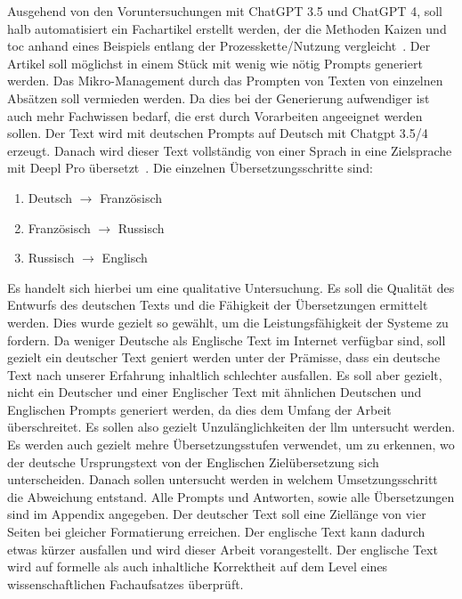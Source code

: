 
Ausgehend von den Voruntersuchungen mit ChatGPT 3.5 und ChatGPT 4, soll halb automatisiert ein Fachartikel erstellt werden,
der die Methoden Kaizen und \gls{toc} anhand eines Beispiels entlang der Prozesskette/Nutzung vergleicht~\cite{openai_chatgpt_nodate}.
Der Artikel soll möglichst in einem Stück mit wenig wie nötig Prompts generiert werden. Das Mikro-Management durch das Prompten von Texten von einzelnen Absätzen soll vermieden werden. Da dies bei der Generierung aufwendiger ist auch mehr Fachwissen bedarf, die erst durch Vorarbeiten angeeignet werden sollen.
Der Text wird mit deutschen Prompts auf Deutsch mit Chatgpt 3.5/4 erzeugt. Danach wird dieser Text vollständig von einer Sprach in eine Zielsprache mit Deepl Pro übersetzt~\cite{deepl_deepl_nodate}.
Die einzelnen Übersetzungsschritte sind:

\begin{enumerate}
	\item Deutsch $\rightarrow$ Französisch
	\item Französisch $\rightarrow$ Russisch
	\item Russisch $\rightarrow$ Englisch
\end{enumerate}

Es handelt sich hierbei um eine qualitative Untersuchung. Es soll die Qualität des Entwurfs des deutschen Texts und die Fähigkeit der Übersetzungen ermittelt werden. Dies wurde gezielt so gewählt, um die Leistungsfähigkeit der Systeme zu fordern. Da weniger Deutsche als Englische Text im Internet verfügbar sind, soll gezielt ein deutscher Text geniert werden unter der Prämisse, dass ein deutsche Text nach unserer Erfahrung inhaltlich schlechter ausfallen. Es soll aber gezielt, nicht ein Deutscher und einer Englischer Text mit ähnlichen Deutschen und Englischen Prompts generiert werden, da dies dem Umfang der Arbeit überschreitet. Es sollen also gezielt Unzulänglichkeiten der \gls{llm} untersucht werden.
Es werden auch gezielt mehre Übersetzungsstufen verwendet, um zu erkennen, wo der deutsche Ursprungstext von der Englischen Zielübersetzung sich unterscheiden. Danach sollen untersucht werden in welchem Umsetzungsschritt die Abweichung entstand.
Alle Prompts und Antworten, sowie alle Übersetzungen sind im Appendix angegeben.
Der deutscher Text soll eine Ziellänge von vier Seiten bei gleicher Formatierung erreichen. Der englische Text kann dadurch etwas kürzer ausfallen und wird dieser Arbeit vorangestellt.
Der englische Text wird auf formelle als auch inhaltliche Korrektheit auf dem Level eines wissenschaftlichen Fachaufsatzes überprüft.
